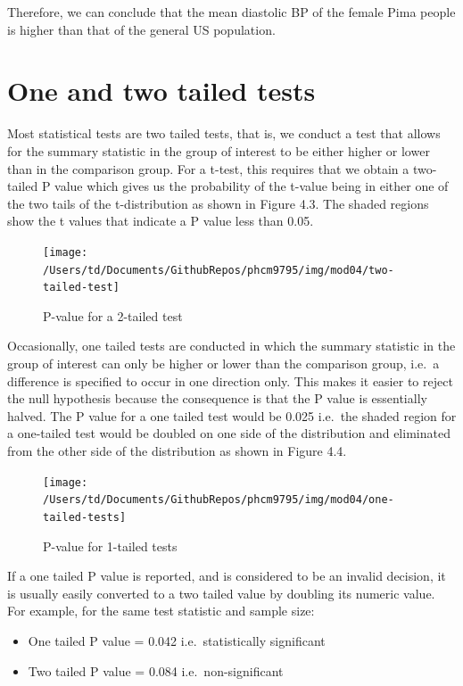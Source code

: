 \documentclass[
]{memoir}
\providecommand{\tightlist}{%
  \setlength{\itemsep}{0pt}\setlength{\parskip}{0pt}}
\begin{document}
Therefore, we can conclude that the mean diastolic BP of the female Pima people is higher than that of the general US population.

\hypertarget{one-and-two-tailed-tests}{%
\section{One and two tailed tests}\label{one-and-two-tailed-tests}}

Most statistical tests are two tailed tests, that is, we conduct a test that allows for the summary statistic in the group of interest to be either higher or lower than in the comparison group. For a t-test, this requires that we obtain a two-tailed P value which gives us the probability of the t-value being in either one of the two tails of the t-distribution as shown in Figure 4.3. The shaded regions show the t values that indicate a P value less than 0.05.

\begin{figure}
\texttt{[image: /Users/td/Documents/GithubRepos/phcm9795/img/mod04/two-tailed-test]} \caption{P-value for a 2-tailed test}\label{fig:two-tailed-test}
\end{figure}

Occasionally, one tailed tests are conducted in which the summary statistic in the group of interest can only be higher or lower than the comparison group, i.e.~a difference is specified to occur in one direction only. This makes it easier to reject the null hypothesis because the consequence is that the P value is essentially halved. The P value for a one tailed test would be 0.025 i.e.~the shaded region for a one-tailed test would be doubled on one side of the distribution and eliminated from the other side of the distribution as shown in Figure 4.4.

\begin{figure}
\texttt{[image: /Users/td/Documents/GithubRepos/phcm9795/img/mod04/one-tailed-tests]} \caption{P-value for 1-tailed tests}\label{fig:one-tailed-tests}
\end{figure}

If a one tailed P value is reported, and is considered to be an invalid decision, it is usually easily converted to a two tailed value by doubling its numeric value. For example, for the same test statistic and sample size:

\begin{itemize}
\tightlist
\item
  One tailed P value = 0.042 i.e.~statistically significant
\item
  Two tailed P value = 0.084 i.e.~non-significant
\end{itemize}
\end{document}

